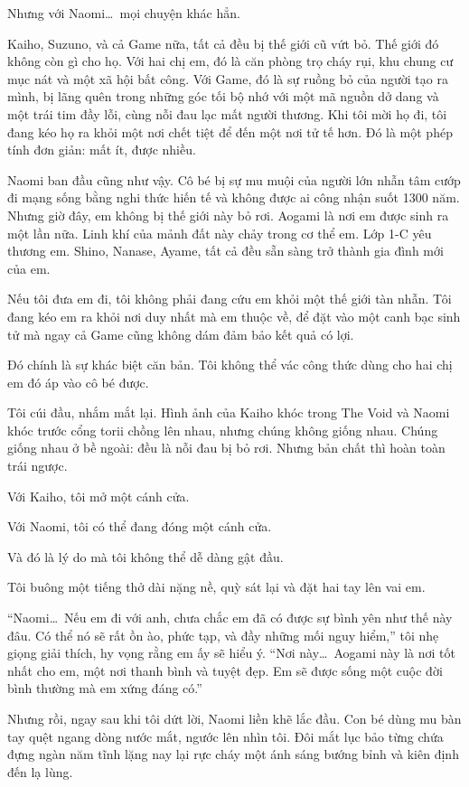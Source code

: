 \documentclass[../main.tex]{subfiles}
\begin{document}
Nhưng với Naomi\dots\ mọi chuyện khác hẳn.

Kaiho, Suzuno, và cả Game nữa, tất cả đều bị thế giới cũ vứt bỏ. Thế giới đó không còn gì cho họ. Với hai chị em, đó là căn phòng trọ cháy rụi, khu chung cư mục nát và một xã hội bất công. Với Game, đó là sự ruồng bỏ của người tạo ra mình, bị lãng quên trong những góc tối bộ nhớ với một mã nguồn dở dang và một trái tim đầy lỗi, cùng nỗi đau lạc mất người thương. Khi tôi mời họ đi, tôi đang kéo họ ra khỏi một nơi chết tiệt để đến một nơi tử tế hơn. Đó là một phép tính đơn giản: mất ít, được nhiều.

Naomi ban đầu cũng như vậy. Cô bé bị sự mu muội của người lớn nhẫn tâm cướp đi mạng sống bằng nghi thức hiến tế và không được ai công nhận suốt 1300 năm. Nhưng giờ đây, em không bị thế giới này bỏ rơi. Aogami là nơi em được sinh ra một lần nữa. Linh khí của mảnh đất này chảy trong cơ thể em. Lớp 1-C yêu thương em. Shino, Nanase, Ayame, tất cả đều sẵn sàng trở thành gia đình mới của em.

Nếu tôi đưa em đi, tôi không phải đang cứu em khỏi một thế giới tàn nhẫn. Tôi đang kéo em ra khỏi nơi duy nhất mà em thuộc về, để đặt vào một canh bạc sinh tử mà ngay cả Game cũng không dám đảm bảo kết quả có lợi.

Đó chính là sự khác biệt căn bản. Tôi không thể vác công thức dùng cho hai chị em đó áp vào cô bé được.

Tôi cúi đầu, nhắm mắt lại. Hình ảnh của Kaiho khóc trong The Void và Naomi khóc trước cổng torii chồng lên nhau, nhưng chúng không giống nhau. Chúng giống nhau ở bề ngoài: đều là nỗi đau bị bỏ rơi. Nhưng bản chất thì hoàn toàn trái ngược.

Với Kaiho, tôi mở một cánh cửa.

Với Naomi, tôi có thể đang đóng một cánh cửa.

Và đó là lý do mà tôi không thể dễ dàng gật đầu.

Tôi buông một tiếng thở dài nặng nề, quỳ sát lại và đặt hai tay lên vai em.

``Naomi\dots\ Nếu em đi với anh, chưa chắc em đã có được sự bình yên như thế này đâu. Có thể nó sẽ rất ồn ào, phức tạp, và đầy những mối nguy hiểm,'' tôi nhẹ giọng giải thích, hy vọng rằng em ấy sẽ hiểu ý. ``Nơi này\dots\ Aogami này là nơi tốt nhất cho em, một nơi thanh bình và tuyệt đẹp. Em sẽ được sống một cuộc đời bình thường mà em xứng đáng có.''

Nhưng rồi, ngay sau khi tôi dứt lời, Naomi liền khẽ lắc đầu. Con bé dùng mu bàn tay quệt ngang dòng nước mắt, ngước lên nhìn tôi. Đôi mắt lục bảo từng chứa đựng ngàn năm tĩnh lặng nay lại rực cháy một ánh sáng bướng bỉnh và kiên định đến lạ lùng.
\end{document}
